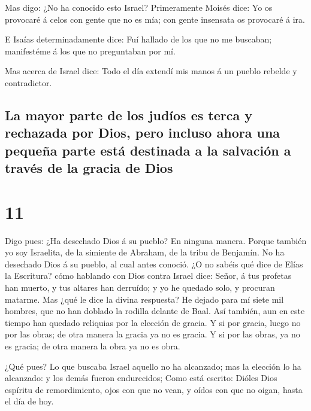  Mas digo: ¿No ha conocido esto Israel? Primeramente
Moisés dice: Yo os provocaré á celos con gente que no es mía; con gente
insensata os provocaré á ira.

 E Isaías determinadamente dice: Fuí hallado de los que
no me buscaban; manifestéme á los que no preguntaban por mí.

 Mas acerca de Israel dice: Todo el día extendí mis manos
á un pueblo rebelde y contradictor.

\hypertarget{la-mayor-parte-de-los-juduxedos-es-terca-y-rechazada-por-dios-pero-incluso-ahora-una-pequeuxf1a-parte-estuxe1-destinada-a-la-salvaciuxf3n-a-travuxe9s-de-la-gracia-de-dios}{%
\subsection{La mayor parte de los judíos es terca y rechazada por Dios,
pero incluso ahora una pequeña parte está destinada a la salvación a
través de la gracia de
Dios}\label{la-mayor-parte-de-los-juduxedos-es-terca-y-rechazada-por-dios-pero-incluso-ahora-una-pequeuxf1a-parte-estuxe1-destinada-a-la-salvaciuxf3n-a-travuxe9s-de-la-gracia-de-dios}}

\hypertarget{section-10}{%
\section{11}\label{section-10}}

 Digo pues: ¿Ha desechado Dios á su pueblo? En ninguna
manera. Porque también yo soy Israelita, de la simiente de Abraham, de
la tribu de Benjamín.  No ha desechado Dios á su pueblo,
al cual antes conoció. ¿O no sabéis qué dice de Elías la Escritura? cómo
hablando con Dios contra Israel dice:  Señor, á tus
profetas han muerto, y tus altares han derruído; y yo he quedado solo, y
procuran matarme.  Mas ¿qué le dice la divina respuesta?
He dejado para mí siete mil hombres, que no han doblado la rodilla
delante de Baal.  Así también, aun en este tiempo han
quedado reliquias por la elección de gracia.  Y si por
gracia, luego no por las obras; de otra manera la gracia ya no es
gracia. Y si por las obras, ya no es gracia; de otra manera la obra ya
no es obra.

 ¿Qué pues? Lo que buscaba Israel aquello no ha alcanzado;
mas la elección lo ha alcanzado: y los demás fueron endurecidos;
 Como está escrito: Dióles Dios espíritu de remordimiento,
ojos con que no vean, y oídos con que no oigan, hasta el día de hoy.

